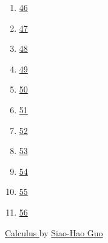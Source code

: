 \documentclass[11pt]{article}
\begin{document}
\begin{multicols}{6}
\begin{enumerate}
		\item 	\href{https://mp.weixin.qq.com/s/86aZRRVwR0C_uuVSxCMsHw}{46}	%
		\item 	\href{https://mp.weixin.qq.com/s/1W_WmCllb0_nITT9LUN4OA}{47}	%
		\item 	\href{https://mp.weixin.qq.com/s/DxbNhI3yA7PQ4p0yzn6xkw}{48}	%
		\item 	\href{https://mp.weixin.qq.com/s/xZFldLwI4vOiGMiCtvODjA}{49}	%
		\item 	\href{https://mp.weixin.qq.com/s/xdGPGoOgEzkvokycqYcRmw}{50}	%
		\item 	\href{https://mp.weixin.qq.com/s/Tq-QTbeGY_VW4m2HBQUdSA}{51}	%
		\item 	\href{https://mp.weixin.qq.com/s/S_dEabQfxm66_iMD0RRB9Q}{52}	%
		\item 	\href{https://mp.weixin.qq.com/s/s1w9Q2Q9xbr6Nuuqa8hfYw}{53}	%
		\item 	\href{https://mp.weixin.qq.com/s/MbnYDteT2qecKIWCjasypw}{54}	%
		\item 	\href{https://mp.weixin.qq.com/s/uJzmOgvmJdQSWgcocvSg9g}{55}	%
		\item 	\href{https://mp.weixin.qq.com/s/spdM1KPiRo23KYp4uAS-EA}{56}	%
	\end{enumerate}
\end{multicols}

\begin{center}
	\large \href{https://www.youtube.com/playlist?list=PLVJXJebpO4PiisQHBKDG9hV5J0oSU6UI6}{Calculus } by \href{https://www.math.ntu.edu.tw/entity_people/entity_people/21719}{Siao-Hao Guo}
\end{center}

\vspace{-0.75cm}
\end{document}
